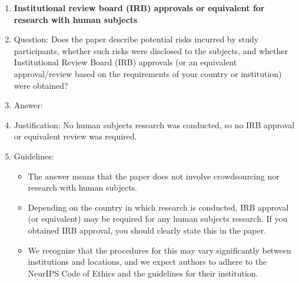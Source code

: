 \begin{enumerate}
\item {\bf Institutional review board (IRB) approvals or equivalent for research with human subjects}
    \item[] Question: Does the paper describe potential risks incurred by study participants, whether such risks were disclosed to the subjects, and whether Institutional Review Board (IRB) approvals (or an equivalent approval/review based on the requirements of your country or institution) were obtained?
    \item[] Answer: \answerNA{}
    \item[] Justification: No human subjects research was conducted, so no IRB approval or equivalent review was required.
    \item[] Guidelines:
    \begin{itemize}
        \item The answer \answerNA{} means that the paper does not involve crowdsourcing nor research with human subjects.
        \item Depending on the country in which research is conducted, IRB approval (or equivalent) may be required for any human subjects research. If you obtained IRB approval, you should clearly state this in the paper. 
        \item We recognize that the procedures for this may vary significantly between institutions and locations, and we expect authors to adhere to the NeurIPS Code of Ethics and the guidelines for their institution. 
    \end{itemize}


\end{enumerate}
